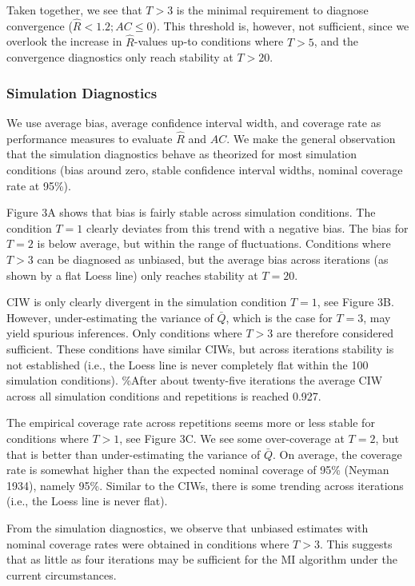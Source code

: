 \documentclass[
  Royal, times, sageapa]{sagej}
\begin{document}
Taken together, we see that \(T>3\) is the minimal requirement to
diagnose convergence (\(\widehat{R} < 1.2; AC \leq 0\)). This threshold
is, however, not sufficient, since we overlook the increase in
\(\widehat{R}\)-values up-to conditions where \(T>5\), and the
convergence diagnostics only reach stability at \(T>20\).

\hypertarget{simulation-diagnostics}{%
\subsubsection{Simulation Diagnostics}\label{simulation-diagnostics}}

We use average bias, average confidence interval width, and coverage
rate as performance measures to evaluate \(\widehat{R}\) and \(AC\). We
make the general observation that the simulation diagnostics behave as
theorized for most simulation conditions (bias around zero, stable
confidence interval widths, nominal coverage rate at 95\%).

Figure 3A shows that bias is fairly stable across simulation conditions.
The condition \(T=1\) clearly deviates from this trend with a negative
bias. The bias for \(T=2\) is below average, but within the range of
fluctuations. Conditions where \(T>3\) can be diagnosed as unbiased, but
the average bias across iterations (as shown by a flat Loess line) only
reaches stability at \(T=20\).

CIW is only clearly divergent in the simulation condition \(T=1\), see
Figure 3B. However, under-estimating the variance of \(\bar{Q}\), which
is the case for \(T=3\), may yield spurious inferences. Only conditions
where \(T>3\) are therefore considered sufficient. These conditions have
similar CIWs, but across iterations stability is not established (i.e.,
the Loess line is never completely flat within the 100 simulation
conditions). \%After about twenty-five iterations the average CIW across
all simulation conditions and repetitions is reached 0.927.

The empirical coverage rate across repetitions seems more or less stable
for conditions where \(T>1\), see Figure 3C. We see some over-coverage
at \(T=2\), but that is better than under-estimating the variance of
\(\bar{Q}\). On average, the coverage rate is somewhat higher than the
expected nominal coverage of 95\% (Neyman 1934), namely 95\%. Similar to
the CIWs, there is some trending across iterations (i.e., the Loess line
is never flat).

From the simulation diagnostics, we observe that unbiased estimates with
nominal coverage rates were obtained in conditions where \(T>3\). This
suggests that as little as four iterations may be sufficient for the MI
algorithm under the current circumstances.
\end{document}
